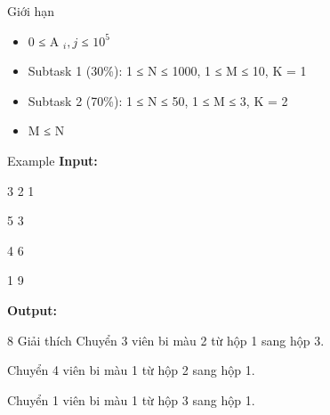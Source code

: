 Giới hạn
\begin{itemize}
	\item     0 ≤ A    $_     i, j    $    ≤ $10^{5}$
	\item     Subtask 1 (30\%): 1 ≤ N ≤ 1000, 1 ≤ M ≤ 10, K = 1   
	\item     Subtask 2 (70\%): 1 ≤ N ≤ 50, 1 ≤ M ≤ 3, K = 2   
	\item     M ≤ N   
\end{itemize}
Example
\textbf{    Input:   }

   3 2 1  

   5 3  

   4 6  

   1 9  

\textbf{    Output:   }

   8
Giải thích
Chuyển 3 viên bi màu 2 từ hộp 1 sang hộp 3.  

   Chuyển 4 viên bi màu 1 từ hộp 2 sang hộp 1.  

   Chuyển 1 viên bi màu 1 từ hộp 3 sang hộp 1.